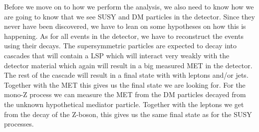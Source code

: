 Before we move on to how we perform the analysis, we also need to know how we are going to know that we see SUSY and DM particles in the detector. Since they never have been discovered, we have to lean on some hypotheses on how this is happening. As for all events in the detector, we have to reconstruct the events using their decays. The supersymmetric particles are expected to decay into cascades that will contain a LSP which will interact very weakly with the detector material which again will result in a big measured MET in the detector. The rest of the cascade will result in a final state with with leptons and/or jets. Together with the MET this gives us the final state we are looking for. For the mono-Z process we can measure the MET from the DM particles decayed from the unknown hypothetical mediator particle. Together with the leptons we get from the decay of the Z-boson, this gives us the same final state as for the SUSY processes.

